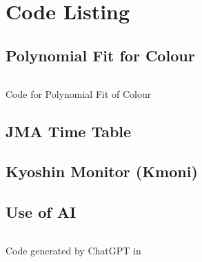 \chapter{Code Listing}
\section{Polynomial Fit for Colour}
\begin{normallisting}
    \inputminted{python3}{\CodeBasePath python/poly-fit.py}
    \caption{Code for Polynomial Fit of Colour}
    \label{code-listing:poly-fit}
\end{normallisting}

\newcommand{\GeneratedTexBase}{outputTex/}

\section{JMA Time Table}


\section{Kyoshin Monitor (Kmoni)}


\section{Use of AI}
\begin{normallisting}
    \inputminted{csharp}{code/websocket-demo.cs}
    \caption{Code generated by ChatGPT in \autocite{gpt-websocket}}
    \label{code-listing:gpt-websocket}
\end{normallisting}